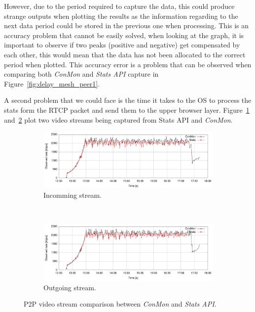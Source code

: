 However, due to the period required to capture the data, this could produce strange outputs when plotting the results as the information regarding to the next data period could be stored in the previous one when processing. This is an accuracy problem that cannot be easily solved, when looking at the graph, it is important to observe if two peaks (positive and negative) get compensated by each other, this would mean that the data has not been allocated to the correct period when plotted. This accuracy error is a problem that can be observed when comparing both {\it ConMon} and {\it Stats API} capture in Figure~\ref{fig:delay_mesh_peer1}. 

A second problem that we could face is the time it takes to the OS to process the stats form the RTCP packet and send them to the upper browser layer. Figure~\ref{fig:p2pincommingStatsConmonWifi} and~\ref{fig:p2poutgoingStatsConmonWifi} plot two video streams being captured from Stats API and {\it ConMon}.

\begin{figure}[h]
        \centering
        \begin{subfigure}[b]{0.5\textwidth}
                \centering
                \includegraphics[width=\textwidth]{./figures/p2p_incomming_cable_sample.pdf}
               \caption[Incomming stream]{Incomming stream.}
			\label{fig:p2pincommingStatsConmonWifi}
        \end{subfigure}%
        ~ %
        \begin{subfigure}[b]{0.5\textwidth}
                \centering
                \includegraphics[width=\textwidth]{./figures/p2p_outgoing_cable_sample.pdf}
               \caption[Outgoing stream]{Outgoing stream.}
			\label{fig:p2poutgoingStatsConmonWifi}
	        \end{subfigure}
        \caption[P2P video stream comparison between {\it ConMon} and {\it Stats API}]{P2P video stream comparison between {\it ConMon} and {\it Stats API}.}
        \label{fig:p2pStatsConmon}
\end{figure}

